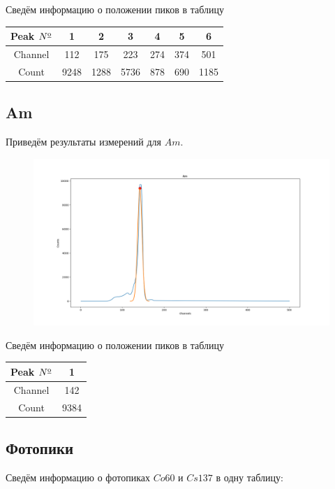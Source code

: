 \documentclass{article}
\begin{document}
Сведём информацию о положении пиков в таблицу

\begin{table}[H]
	\centering
	\begin{tabular}{|c|c|c|c|c|c|c|}
		\hline
		Peak \(N\textsuperscript{\underline{o}}\)& 1 & 2 & 3 & 4 & 5 & 6\\\hline
		Channel & 112 & 175 & 223 & 274 & 374 & 501\\\hline
		Count   & 9248 & 1288 & 5736 & 878 & 690 & 1185 \\\hline
	\end{tabular}
\end{table}

\subsection{Am}
Приведём результаты измерений для \(Am\).

\begin{figure}[H]
	\includegraphics[width=\textwidth]{Am.png}
\end{figure}

Сведём информацию о положении пиков в таблицу

\begin{table}[H]
	\centering
	\begin{tabular}{|c|c|}
		\hline
		Peak \(N\textsuperscript{\underline{o}}\)& 1\\\hline
		Channel & 142 \\\hline
		Count   & 9384 \\\hline
	\end{tabular}
\end{table}

\subsection{Фотопики}
Сведём информацию о фотопиках \(Co60\) и \(Cs137\) в одну таблицу:
\end{document}

